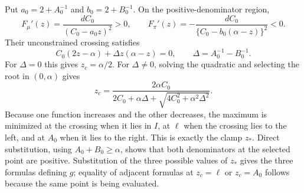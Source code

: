 Put \(a_0=2+A_0^{-1}\) and \(b_0=2+B_0^{-1}\). On the positive-denominator region,
\[
F_\mu'(z)=\frac{dC_0}{(C_0-a_0z)^2}>0,
\qquad
F_\pi'(z)=-\frac{dC_0}{\{C_0-b_0(\alpha-z)\}^2}<0.
\]
Their unconstrained crossing satisfies
\[
C_0(2z-\alpha)+\Delta z(\alpha-z)=0,
\qquad \Delta=A_0^{-1}-B_0^{-1}.
\]
For \(\Delta=0\) this gives \(z_c=\alpha/2\). For \(\Delta\ne0\), solving the quadratic and selecting the root in \((0,\alpha)\) gives
\[
z_c=\frac{2\alpha C_0}{2C_0+\alpha\Delta+\sqrt{4C_0^2+\alpha^2\Delta^2}}.
\]
Because one function increases and the other decreases, the maximum is minimized at the crossing when it lies in \(I\), at \(\ell\) when the crossing lies to the left, and at \(A_0\) when it lies to the right. This is exactly the clamp \(z_*\). Direct substitution, using \(A_0+B_0\ge\alpha\), shows that both denominators at the selected point are positive. Substitution of the three possible values of \(z_*\) gives the three formulas defining \(g\); equality of adjacent formulas at \(z_c=\ell\) or \(z_c=A_0\) follows because the same point is being evaluated.